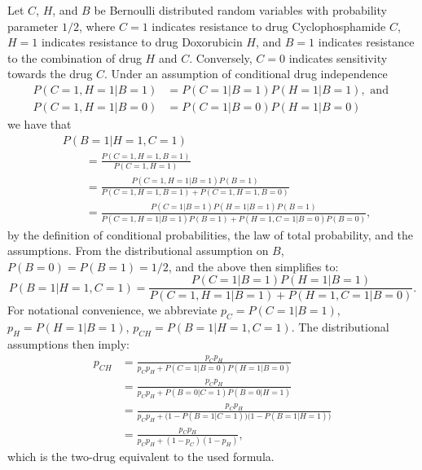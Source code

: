 Let $C$, $H$, and $B$ be Bernoulli distributed random variables with probability parameter $1/2$, where
$C = 1$ indicates resistance to drug Cyclophosphamide $C$,
$H = 1$ indicates resistance to drug Doxorubicin $H$, and
$B = 1$ indicates resistance to the combination of drug $H$ and $C$.
Conversely, $C = 0$ indicates sensitivity towards the drug $C$.
Under an assumption of conditional drug independence
\begin{align*}
  P(C=1, H=1| B=1) &= P(C=1 | B=1) P(H=1 | B=1), \text{ and } \\
  P(C=1, H=1| B=0) &= P(C=1 | B=0) P(H=1 | B=0)
\end{align*}
we have that
\begin{align*}
  &P(B=1 | H=1, C=1)
  \\&\qquad
   = \frac{P(C=1, H=1, B=1)}
          {P(C=1, H=1)}
  \\&\qquad
   = \frac{P(C=1, H=1 | B=1) P(B=1)}
          {P(C=1, H=1, B=1) + P(C=1, H=1, B=0)}
  \\&\qquad
   = \frac{P(C=1 | B=1) P(H=1 | B=1) P(B=1)}
          {P(C=1, H=1 | B=1) P(B=1) + P(H=1, C=1| B=0) P(B=0)},
\end{align*}
by the definition of conditional probabilities, the law of total probability, and the assumptions.
From the distributional assumption on $B$, $P(B=0) = P(B=1) = 1/2$, and the above then simplifies to:
\begin{equation*}
  P(B=1 | H=1, C=1)
   = \frac{P(C=1 | B=1) P(H=1 | B=1)}
          {P(C=1, H=1 | B=1) + P(H=1, C=1 | B=0)}.
\end{equation*}
For notational convenience, we abbreviate
$p_C = P(C=1 | B=1)$,
$p_H = P(H=1 | B=1)$,
$p_{CH} = P(B=1 | H=1, C=1)$.
The distributional assumptions then imply:
\begin{align*}
  p_{CH}
  &= \frac{p_C p_H}
          {p_C p_H + P(C=1 | B=0) P(H=1 | B=0)}
  \\
  &= \frac{p_C p_H}
          {p_C p_H + P(B=0 | C=1) P(B=0 | H=1)}
  \\
  &= \frac{p_C p_H}
          {p_C p_H + \bigl(1 - P(B=1 | C=1)\bigr)\bigl(1 - P(B=1 | H=1)\bigr)}
  \\
  &= \frac{p_C p_H}
          {p_C p_H + (1 - p_C)(1 - p_H)},
\end{align*}
which is the two-drug equivalent to the used formula.

% 